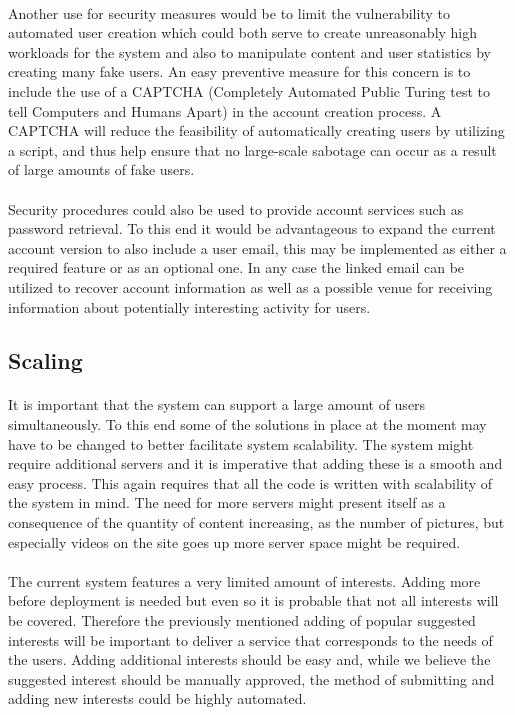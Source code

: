 \paragraph{} Another use for security measures would be to limit the vulnerability to automated user creation which could both serve to create unreasonably high workloads for the system and also to manipulate content and user statistics by creating many fake users. An easy preventive measure for this concern is to include the use of a CAPTCHA (Completely Automated Public Turing test to tell Computers and Humans Apart) in the account creation process. A CAPTCHA will reduce the feasibility of automatically creating users by utilizing a script, and thus help ensure that no large-scale sabotage can occur as a result of large amounts of fake users.
\paragraph{} Security procedures could also be used to provide account services such as password retrieval. To this end it would be advantageous to expand the current account version to also include a user email, this may be implemented as either a required feature or as an optional one. In any case the linked email can be utilized to recover account information as well as a possible venue for receiving information about potentially interesting activity for users.

\subsection{Scaling}
\label{subsec:FurtherRequiredScaling}

\paragraph{} It is important that the system can support a large amount of users simultaneously. To this end some of the solutions in place at the moment may have to be changed to better facilitate system scalability. The system might require additional servers and it is imperative that adding these is a smooth and easy process. This again requires that all the code is written with scalability of the system in mind. The need for more servers might present itself as a consequence of the quantity of content increasing, as the number of pictures, but especially videos on the site goes up more server space might be required.
\paragraph{} The current system features a very limited amount of interests. Adding more before deployment is needed but even so it is probable that not all interests will be covered. Therefore the previously mentioned adding of popular suggested interests will be important to deliver a service that corresponds to the needs of the users. Adding additional interests should be easy and, while we believe the suggested interest should be manually approved, the method of submitting and adding new interests could be highly automated.
